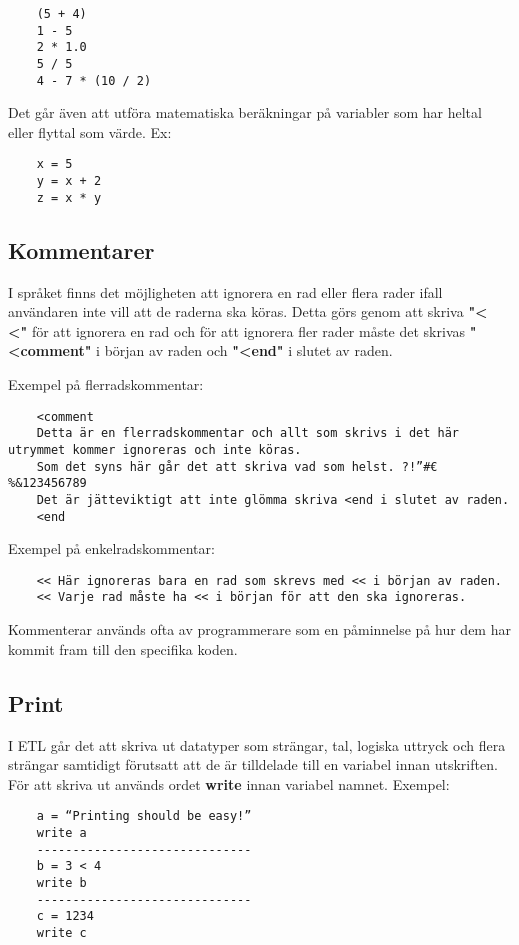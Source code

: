 \documentclass{TDP019mall}
\begin{document}
\begin{verbatim}
    (5 + 4)
    1 - 5
    2 * 1.0
    5 / 5
    4 - 7 * (10 / 2)
\end{verbatim}

Det går även att utföra matematiska beräkningar på variabler som har heltal eller flyttal som värde. Ex:
\begin{verbatim}
    x = 5
    y = x + 2
    z = x * y
\end{verbatim}

\subsection{Kommentarer}
I språket finns det möjligheten att ignorera en rad eller flera rader ifall användaren inte vill att de raderna ska köras. 
Detta görs genom att skriva \textbf{"< <"} för att ignorera en rad och för att ignorera fler rader måste det skrivas 
\textbf{"<comment"} i början av raden och \textbf{"<end"} i slutet av raden.

Exempel på flerradskommentar:
\begin{verbatim}
    <comment 
    Detta är en flerradskommentar och allt som skrivs i det här utrymmet kommer ignoreras och inte köras. 
    Som det syns här går det att skriva vad som helst. ?!”#€%&123456789
    Det är jätteviktigt att inte glömma skriva <end i slutet av raden.
    <end
\end{verbatim}
 
Exempel på enkelradskommentar:
\begin{verbatim}
    << Här ignoreras bara en rad som skrevs med << i början av raden.
    << Varje rad måste ha << i början för att den ska ignoreras.
\end{verbatim}
 
Kommenterar används ofta av programmerare som en påminnelse på hur dem har kommit fram till den specifika koden.

\subsection{Print}
I ETL går det att skriva ut datatyper som strängar, tal, logiska uttryck och flera strängar samtidigt förutsatt att de är tilldelade till en variabel innan utskriften. 
För att skriva ut används ordet \textbf{write} innan variabel namnet. 
Exempel: 
 
\begin{verbatim}
    a = “Printing should be easy!”
    write a
    ------------------------------
    b = 3 < 4
    write b
    ------------------------------
    c = 1234
    write c
\end{verbatim}
 
\end{document}
